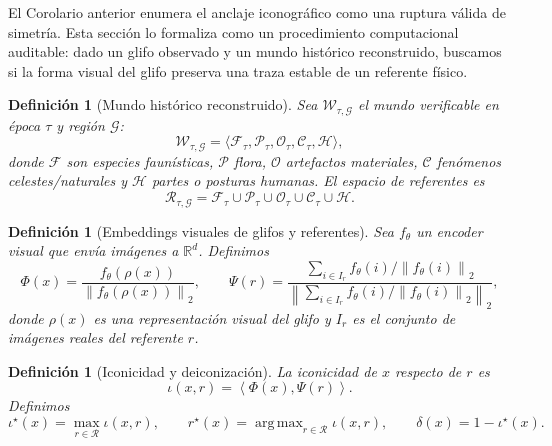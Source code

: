 \documentclass[11pt,a4paper]{article}
\newtheorem{definition}[theorem]{Definición}
\DeclareMathOperator*{\argmax}{arg\,max}
\newcommand{\R}{\mathbb{R}}
\newcommand{\1}{\mathbf{1}}
\newcommand{\norm}[1]{\left\lVert #1 \right\rVert}
\newcommand{\inner}[2]{\left\langle #1,#2 \right\rangle}
\numberwithin{equation}{section}
\begin{document}
El Corolario anterior enumera el anclaje iconográfico como una ruptura válida de simetría. Esta sección lo formaliza como un procedimiento computacional auditable: dado un glifo observado y un mundo histórico reconstruido, buscamos si la forma visual del glifo preserva una traza estable de un referente físico.

\begin{definition}[Mundo histórico reconstruido]
Sea $\mathcal{W}_{\tau,\mathcal{G}}$ el mundo verificable en época $\tau$ y región $\mathcal{G}$:
\begin{equation}
    \mathcal{W}_{\tau,\mathcal{G}}
    =
    \langle \mathcal{F}_{\tau},\mathcal{P}_{\tau},\mathcal{O}_{\tau},\mathcal{C}_{\tau},\mathcal{H}\rangle,
\end{equation}
donde $\mathcal{F}$ son especies faunísticas, $\mathcal{P}$ flora, $\mathcal{O}$ artefactos materiales, $\mathcal{C}$ fenómenos celestes/naturales y $\mathcal{H}$ partes o posturas humanas. El espacio de referentes es
\begin{equation}
    \mathcal{R}_{\tau,\mathcal{G}}
    =
    \mathcal{F}_{\tau}\cup\mathcal{P}_{\tau}\cup\mathcal{O}_{\tau}\cup\mathcal{C}_{\tau}\cup\mathcal{H}.
\end{equation}
\end{definition}

\begin{definition}[Embeddings visuales de glifos y referentes]
Sea $f_\theta$ un encoder visual que envía imágenes a $\R^d$. Definimos
\begin{equation}
    \Phi(x)=\frac{f_\theta(\rho(x))}{\norm{f_\theta(\rho(x))}_2},
    \qquad
    \Psi(r)=
    \frac{\sum_{i\in I_r} f_\theta(i)/\norm{f_\theta(i)}_2}
         {\norm{\sum_{i\in I_r} f_\theta(i)/\norm{f_\theta(i)}_2}_2},
\end{equation}
donde $\rho(x)$ es una representación visual del glifo y $I_r$ es el conjunto de imágenes reales del referente $r$.
\end{definition}

\begin{definition}[Iconicidad y deiconización]
La iconicidad de $x$ respecto de $r$ es
\begin{equation}
    \iota(x,r)=\inner{\Phi(x)}{\Psi(r)}.
\end{equation}
Definimos
\begin{equation}
    \iota^\star(x)=\max_{r\in\mathcal{R}}\iota(x,r),
    \qquad
    r^\star(x)=\argmax_{r\in\mathcal{R}}\iota(x,r),
    \qquad
    \delta(x)=1-\iota^\star(x).
\end{equation}
\end{definition}
\end{document}
